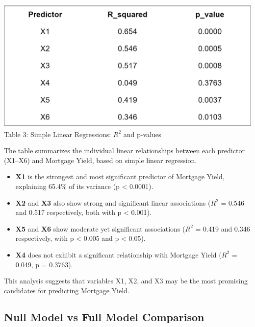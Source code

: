\documentclass[
  11pt,
]{article}
\providecommand{\tightlist}{%
  \setlength{\itemsep}{0pt}\setlength{\parskip}{0pt}}
\begin{document}
\begin{minipage}{0.5\textwidth}
\includegraphics[width=\linewidth]{simple_regression_table.png}\\
\small Table 3: Simple Linear Regressions: $R^2$ and p-values
\end{minipage}
\hspace{1em}
\begin{minipage}{0.52\textwidth}
\small
The table summarizes the individual linear relationships between each predictor (X1–X6) and Mortgage Yield, based on simple linear regression.
\begin{itemize}
\item \textbf{X1} is the strongest and most significant predictor of Mortgage Yield, explaining 65.4\% of its variance (p < 0.0001).
\item \textbf{X2} and \textbf{X3} also show strong and significant linear associations ($R^2$ = 0.546 and 0.517 respectively, both with p < 0.001).
\item \textbf{X5} and \textbf{X6} show moderate yet significant associations ($R^2$ = 0.419 and 0.346 respectively, with p < 0.005 and p < 0.05).
\end{itemize}
\end{minipage}
\addtocounter{table}{1}

\begin{itemize}
\tightlist
\item
  \textbf{X4} does not exhibit a significant relationship with Mortgage
  Yield (\(R^2\) = 0.049, p = 0.3763).\\
\end{itemize}

This analysis suggests that variables X1, X2, and X3 may be the most
promising candidates for predicting Mortgage Yield.

\subsection{Null Model vs Full Model
Comparison}\label{null-model-vs-full-model-comparison}
\end{document}

